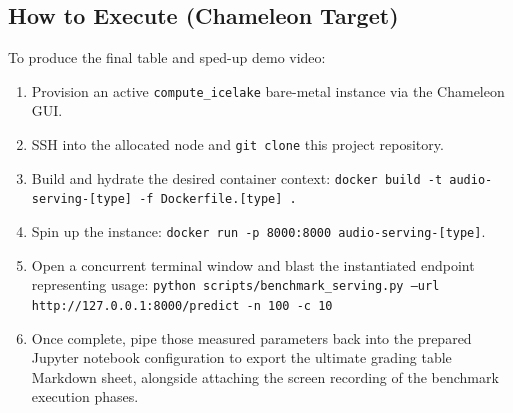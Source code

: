\documentclass{article}
\begin{document}
\subsection{How to Execute (Chameleon Target)}
To produce the final table and sped-up demo video:
\begin{enumerate}
    \item Provision an active \texttt{compute\_icelake} bare-metal instance via the Chameleon GUI.
    \item SSH into the allocated node and \texttt{git clone} this project repository.
    \item Build and hydrate the desired container context: \texttt{docker build -t audio-serving-[type] -f Dockerfile.[type] .} 
    \item Spin up the instance: \texttt{docker run -p 8000:8000 audio-serving-[type]}.
    \item Open a concurrent terminal window and blast the instantiated endpoint representing usage: \texttt{python scripts/benchmark\_serving.py --url http://127.0.0.1:8000/predict -n 100 -c 10}
    \item Once complete, pipe those measured parameters back into the prepared Jupyter notebook configuration to export the ultimate grading table Markdown sheet, alongside attaching the screen recording of the benchmark execution phases.
\end{enumerate}
\end{document}
